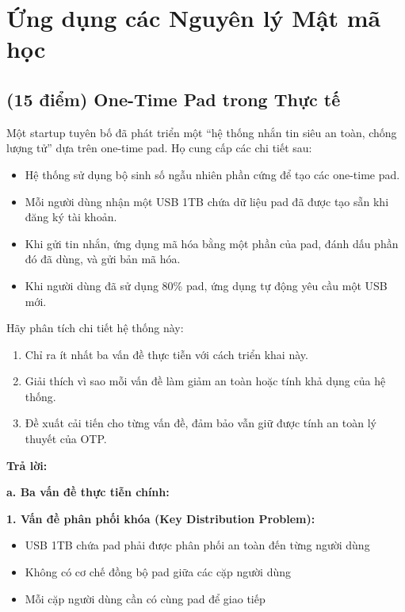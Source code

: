 \section{Ứng dụng các Nguyên lý Mật mã học}

\subsection{(15 điểm) One-Time Pad trong Thực tế}

Một startup tuyên bố đã phát triển một ``hệ thống nhắn tin siêu an toàn, chống lượng tử'' dựa trên one-time pad. Họ cung cấp các chi tiết sau:

\begin{itemize}
    \item Hệ thống sử dụng bộ sinh số ngẫu nhiên phần cứng để tạo các one-time pad.
    \item Mỗi người dùng nhận một USB 1TB chứa dữ liệu pad đã được tạo sẵn khi đăng ký tài khoản.
    \item Khi gửi tin nhắn, ứng dụng mã hóa bằng một phần của pad, đánh dấu phần đó đã dùng, và gửi bản mã hóa.
    \item Khi người dùng đã sử dụng 80\% pad, ứng dụng tự động yêu cầu một USB mới.
\end{itemize}

Hãy phân tích chi tiết hệ thống này:
\begin{enumerate}
    \item Chỉ ra ít nhất ba vấn đề thực tiễn với cách triển khai này.
    \item Giải thích vì sao mỗi vấn đề làm giảm an toàn hoặc tính khả dụng của hệ thống.
    \item Đề xuất cải tiến cho từng vấn đề, đảm bảo vẫn giữ được tính an toàn lý thuyết của OTP.
\end{enumerate}

\begin{center}
\textbf{Trả lời:}
\end{center}

\textbf{a. Ba vấn đề thực tiễn chính:}

\textbf{1. Vấn đề phân phối khóa (Key Distribution Problem):}
\begin{itemize}
    \item USB 1TB chứa pad phải được phân phối an toàn đến từng người dùng
    \item Không có cơ chế đồng bộ pad giữa các cặp người dùng
    \item Mỗi cặp người dùng cần có cùng pad để giao tiếp
\end{itemize}

